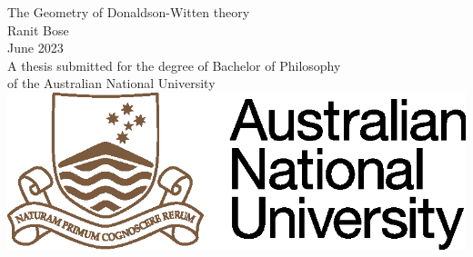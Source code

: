 \begin{titlepage}
\begin{center}

\vspace*{\fill} \Huge
                        The Geometry of Donaldson-Witten theory
\\
\vfill\vfill\Large
                          Ranit Bose
\\
\vfill\vfill
                          June 2023
\\
\vfill\vfill \normalsize
         A thesis submitted for the degree of Bachelor of Philosophy\\
         of the Australian National University
\vfill
         \includegraphics{ANU.eps}

\end{center}

\end{titlepage}
